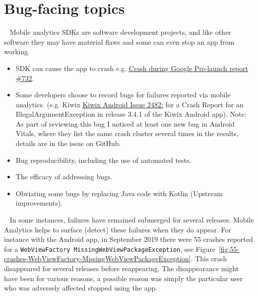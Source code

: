 \section{Bug-facing topics}~\label{aata-bug-facing-topics}
Mobile analytics SDKs are software development projects, and like other software they may have material flaws and some can even stop an app from working. 

\begin{itemize}
    \itemsep0em 
    \item SDK can cause the app to crash e.g. \href{https://github.com/segmentio/analytics-android/issues/732}{Crash during Google Pre-launch report \#732}.
    \item Some developers choose to record bugs for failures reported via mobile analytics. (e.g. Kiwix \href{https://github.com/kiwix/kiwix-android/issues/2482}{Kiwix Android Issue 2482:} for a Crash Report for an IllegalArgumentException in release 3.4.1 of the Kiwix Android app). Note: As part of reviewing this bug I noticed at least one new bug in Android Vitals, where they list the same crash cluster several times in the results, details are in the issue on GitHub.
    \item Bug reproducibility, including the use of automated tests.
    \item The efficacy of addressing bugs.
    \item Obviating some bugs by replacing Java code with Kotlin (Upstream improvements).
\end{itemize}

~\label{section-intermittent-appearances-of-bugs-55-crashes}
In some instances, failures have remained submerged for several releases. Mobile Analytics helps to surface (detect) these failures when they do appear. 
For instance with the  Android app, in September 2019 there were 55 crashes reported for a \texttt{WebViewFactory MissingWebViewPackageException}; see Figure~\ref{fig:55-crashes-WebViewFactory-MissingWebViewPackageException}. This crash disappeared for several releases before reappearing. The disappearance might have been for various reasons, a possible reason was simply the particular user who was adversely affected stopped using the app. 

